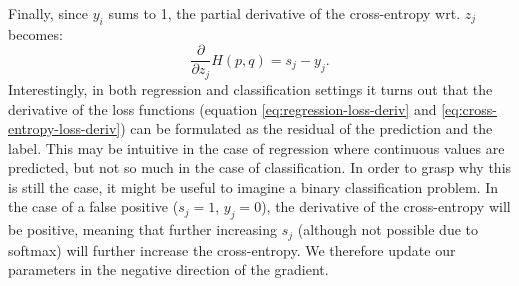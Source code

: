 \documentclass[a4paper,11pt]{article} %
\begin{document}
Finally, since $y_i$ sums to 1, the partial derivative of the cross-entropy wrt. $z_j$ becomes:
\begin{equation} \label{eq:cross-entropy-loss-deriv}
  \frac{\partial}{\partial z_j} H(p, q) = s_j - y_j.
\end{equation}
Interestingly, in both regression and classification settings it turns out that the derivative of the loss functions (equation \ref{eq:regression-loss-deriv} and \ref{eq:cross-entropy-loss-deriv}) can be formulated as the residual of the prediction and the label. This may be intuitive in the case of regression where continuous values are predicted, but not so much in the case of classification. In order to grasp why this is still the case, it might be useful to imagine a binary classification problem. In the case of a false positive ($s_j = 1$, $y_j = 0$), the derivative of the cross-entropy will be positive, meaning that further increasing $s_j$ (although not possible due to softmax) will further increase the cross-entropy. We therefore update our parameters in the negative direction of the gradient.
\end{document}
